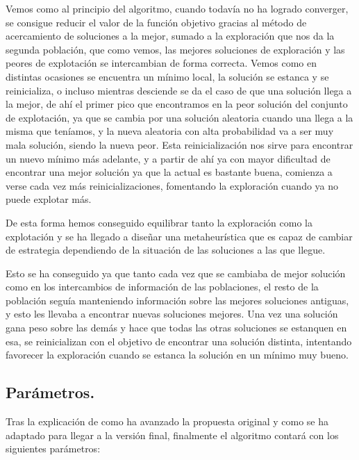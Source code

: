 \documentclass[12pt, spanish]{article}
\begin{document}
Vemos como al principio del algoritmo, cuando todavía no ha logrado converger, se consigue reducir el valor de la función objetivo gracias al método de acercamiento de soluciones a la mejor, sumado a la exploración que nos da la segunda población, que como vemos, las mejores soluciones de exploración y las peores de explotación se intercambian de forma correcta. Vemos como en distintas ocasiones se encuentra un mínimo local, la solución se estanca y se reinicializa, o incluso mientras desciende se da el caso de que una solución llega a la mejor, de ahí el primer pico que encontramos en la peor solución del conjunto de explotación, ya que se cambia por una solución aleatoria cuando una llega a la misma que teníamos, y la nueva aleatoria con alta probabilidad va a ser muy mala solución, siendo la nueva peor. Esta reinicialización nos sirve para encontrar un nuevo mínimo más adelante, y a partir de ahí ya con mayor dificultad de encontrar una mejor solución ya que la actual es bastante buena, comienza a verse cada vez más reinicializaciones, fomentando la exploración cuando ya no puede explotar más.

De esta forma hemos conseguido equilibrar tanto la exploración como la explotación y se ha llegado a diseñar una metaheurística que es capaz de cambiar de estrategia dependiendo de la situación de las soluciones a las que llegue.

Esto se ha conseguido ya que tanto cada vez que se cambiaba de mejor solución como en los intercambios de información de las poblaciones, el resto de la población seguía manteniendo información sobre las mejores soluciones antiguas, y esto les llevaba a encontrar nuevas soluciones mejores. Una vez una solución gana peso sobre las demás y hace que todas las otras soluciones se estanquen en esa, se reinicializan con el objetivo de encontrar una solución distinta, intentando favorecer la exploración cuando se estanca la solución en un mínimo muy bueno.


\subsection{Parámetros.}

Tras la explicación de como ha avanzado la propuesta original y como se ha adaptado para llegar a la versión final, finalmente el algoritmo contará con los siguientes parámetros:
\end{document}
